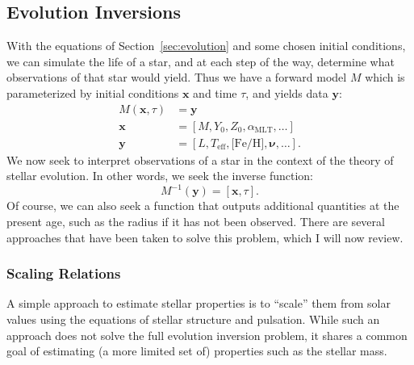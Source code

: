 

\subsection{Evolution Inversions} 

With the equations of Section~\ref{sec:evolution} and some chosen initial conditions, we can simulate the life of a star, and at each step of the way, determine what observations of that star would yield. 
Thus we have a forward model $M$ which is parameterized by initial conditions $\mathbf{x}$ and time $\tau$, and yields data $\mathbf{y}$:
\begin{align}
    M(\mathbf{x}, \tau)
    &=
    \mathbf{y}
    \\
    \mathbf{x}
    &=
    [M,Y_0,Z_0,\alpha_{\text{MLT}}, \ldots]%
    \\
    \mathbf{y}
    &=
    [L, T_{\text{eff}}, \text{[Fe/H]}, \boldsymbol{\nu}, \ldots].
\end{align}
We now seek to interpret observations of a star in the context of the theory of stellar evolution. 
In other words, we seek the inverse function:
\begin{equation}
    M^{-1}(\mathbf{y})
    =
    [\mathbf{x}, \tau].
\end{equation}
Of course, we can also seek a function that outputs additional quantities at the present age, such as the radius if it has not been observed. 
There are several approaches that have been taken to solve this problem, which I will now review. 

\subsubsection*{Scaling Relations}
\label{sec:scaling}
A simple approach to estimate stellar properties is to ``scale'' them from solar values using the equations of stellar structure and pulsation. 
While such an approach does not solve the full evolution inversion problem, it shares a common goal of estimating (a more limited set of) properties such as the stellar mass. 

